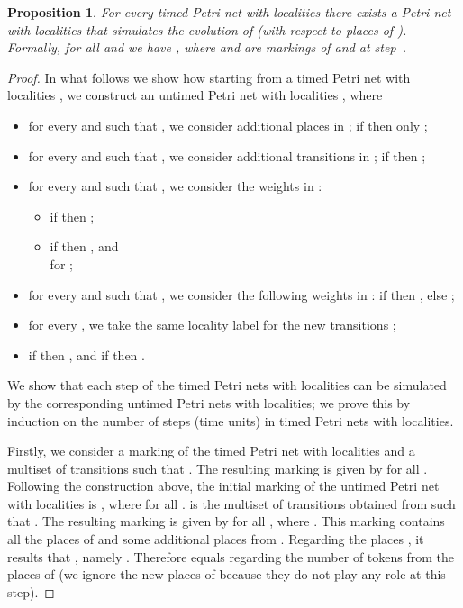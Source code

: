 \documentclass{eptcs}
\newtheorem{proposition}{Proposition}
\begin{document}
\begin{proposition}
\label{tPNtoPN} For every timed Petri net with localities
 there exists a Petri net with
localities  that simulates the
evolution of  (with respect to places of ).
Formally, for all  and  we have
, where  and  are markings of  and
 at step~.
\end{proposition}

\begin{proof} In what follows we show how starting from
a timed Petri net with localities 
, we construct an untimed Petri net with localities
, where
\begin{itemize}
\item for every  and  such that , we
consider additional places 
in ; if  then only ;

\item for every  and  such that , we consider
additional transitions   in ; if
 then ;

\item for every  and  such that ,
we consider the weights  in :
\begin{itemize}
\item if  then ;
\item if  then , and \\

for ;
\end{itemize}

\item for every  and  such that
, we consider the following weights  in
:
if  then , else ;

\item for every , we take the same locality label
 for the new transitions ;

\item if  then
, and if  then  .
\end{itemize}
We show that each step of the timed Petri nets with localities can
be simulated by the corresponding untimed Petri nets with localities;
we prove this by induction on the number of steps (time units)
in timed Petri nets with localities.

Firstly, we consider a marking  of the timed Petri net with
localities and a multiset of transitions  such that . The resulting marking  is given by
 for all . Following
the construction above, the initial marking of the untimed Petri net
with localities is , where  for all .
 is the multiset of transitions obtained from  such that
. The resulting marking  is
given by  for all , where .
This marking contains all the places of  and some additional
places from . Regarding the places , it results that
, namely . Therefore
 equals  regarding the number of tokens from the places
of  (we ignore the new places of  because they do not play
any role at this step).


\end{proof}
\end{document}
